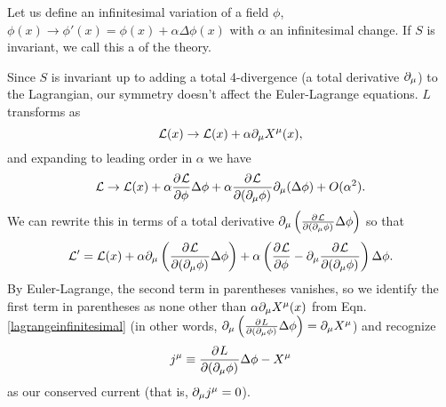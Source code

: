 Let us define an infinitesimal variation of a field $\phi$,
$\phi(x)\to \phi'(x)=\phi(x)+\alpha \Delta \phi(x)$
with $\alpha$ an infinitesimal change. If $S$ is invariant, we call this a  of the theory.

Since $S$ is invariant up to adding a total 4-divergence (a total derivative $\partial_\mu$) to the Lagrangian, our symmetry doesn't affect the Euler-Lagrange equations. $L$ transforms as
\begin{equation}\label{lagrangeinfinitesimal}
\mathcal L(x)\to \mathcal L(x)+\alpha \partial_\mu X^\mu(x),
\end{equation}
and expanding to leading order in $\alpha$ we have
\begin{equation}
\mathcal L\to \mathcal L(x)+\alpha \frac{\partial^{} \mathcal L}{\partial \phi ^{}}\Delta \phi +\alpha \frac{\partial^{} \mathcal L}{\partial (\partial_\mu\phi) ^{}}\partial_\mu(\Delta\phi)+O(\alpha^2).
\end{equation}
We can rewrite this in terms of a total derivative $\partial_\mu\left(\frac{\partial^{} \mathcal L}{\partial (\partial_\mu\phi) ^{}}\Delta \phi\right)$
so that
\begin{equation}
\mathcal L'=\mathcal L(x)+\alpha \partial_\mu\left(\frac{\partial^{} \mathcal L}{\partial (\partial_\mu\phi) ^{}}\Delta \phi\right) +\alpha \left(\frac{\partial^{} \mathcal L}{\partial \phi ^{}}-\partial_\mu \frac{\partial^{} \mathcal L}{\partial (\partial_\mu\phi) ^{}}\right)\Delta \phi.
\end{equation}
By Euler-Lagrange, the second term in parentheses vanishes, so we identify the first term in parentheses as none other than $\alpha \partial_\mu X^\mu(x)$ from Eqn. \ref{lagrangeinfinitesimal} (in other words, $\partial_\mu\left(\frac{\partial^{} L}{\partial (\partial_\mu\phi) ^{}}\Delta \phi\right) =\partial_\mu X^\mu$) and recognize 
\begin{equation}
j^\mu\equiv\frac{\partial^{} L}{\partial (\partial_\mu \phi) ^{}}\Delta \phi -X^\mu
\end{equation} as our conserved current (that is, $\partial_\mu j^\mu =0$).

